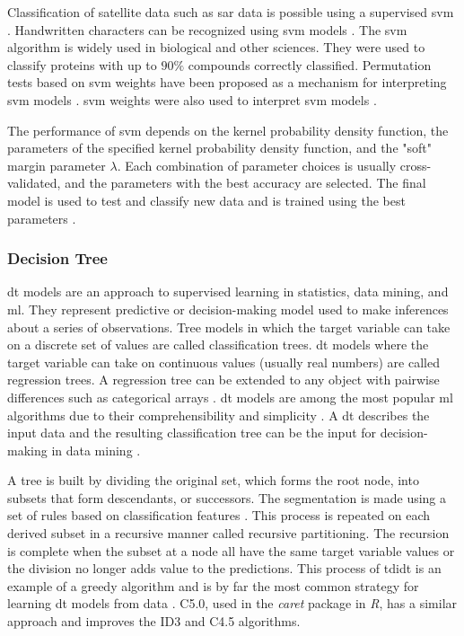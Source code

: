 \documentclass[sn-mathphys-num]{sn-jnl}%
\begin{document}
Classification of satellite data such as \acrfull{sar} data is possible using a supervised \acrshort{svm} \cite{Maity2016}. Handwritten characters can be recognized using \acrshort{svm} models \cite{Decoste2002, Maitra2015}. The \acrshort{svm} algorithm is widely used in biological and other sciences. They were used to classify proteins with up to $90\%$ compounds correctly classified. Permutation tests based on \acrshort{svm} weights have been proposed as a mechanism for interpreting \acrshort{svm} models \cite{Gaonkar2013, Cuingnet2011}. \acrshort{svm} weights were also used to interpret \acrshort{svm} models \cite{Statnikov2006}.

The performance of \acrshort{svm} depends on the kernel probability density function, the parameters of the specified kernel probability density function, and the "soft" margin parameter $\lambda$. Each combination of parameter choices is usually cross-validated, and the parameters with the best accuracy are selected. The final model is used to test and classify new data and is trained using the best parameters \cite{Hsu2003}.

\subsubsection{Decision Tree}

\acrfull{dt} models are an approach to supervised learning in statistics, data mining, and \acrlong{ml}. They represent predictive or decision-making model used to make inferences about a series of observations. Tree models in which the target variable can take on a discrete set of values are called classification trees. \acrshort{dt} models where the target variable can take on continuous values (usually real numbers) are called regression trees. A regression tree can be extended to any object with pairwise differences such as categorical arrays \cite{Studer2011}. \acrshort{dt} models are among the most popular \acrshort{ml} algorithms due to their comprehensibility and simplicity \cite{Wu2008}. A \acrshort{dt} describes the input data and the resulting classification tree can be the input for decision-making in data mining \cite{Rokach2014}.

A tree is built by dividing the original set, which forms the root node, into subsets that form descendants, or successors. The segmentation is made using a set of rules based on classification features \cite{ShalevShwartz2014}. This process is repeated on each derived subset in a recursive manner called recursive partitioning. The recursion is complete when the subset at a node all have the same target variable values or the division no longer adds value to the predictions. This process of \acrfull{tdidt} \cite{Quinlan1986} is an example of a greedy algorithm and is by far the most common strategy for learning \acrshort{dt} models from data \cite{Rokach2005}. C5.0, used in the \textit{caret} package in \textit{R}, has a similar approach and improves the ID3 and C4.5 algorithms.
\end{document}
